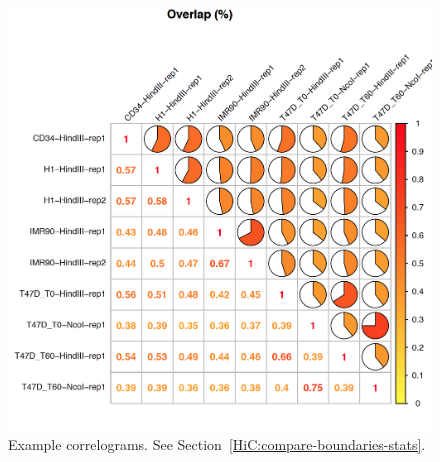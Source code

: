 \begin{figure}[!htb]
    \centering
    \includegraphics[width=\textwidth,height=\textheight,keepaspectratio]{figure/compare-boundaries-stats_correlograms}
    \caption{Example correlograms. See Section~\ref{HiC:compare-boundaries-stats}.} %
    \label{fig:compare-boundaries-stats_correlograms}
\end{figure}
\clearpage